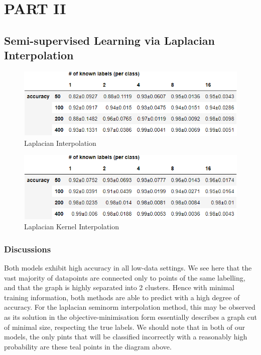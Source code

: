 \documentclass[12pt]{article}
\begin{document}
\newpage
\section{PART II}
\subsection{Semi-supervised Learning via Laplacian Interpolation}


    \begin{figure}[h]
    \centering
    \includegraphics[scale=0.5]{outputs/part2/laplacian_interpolation_report.png}
    \caption{Laplacian Interpolation}
    \label{fig:12}
    \end{figure}

    \begin{figure}[h]
    \centering
    \includegraphics[scale=0.5]{outputs/part2/laplacian_kernel_interpolation_report.png}
    \caption{Laplacian Kernel Interpolation}
    \label{fig:13}
    \end{figure}

\subsubsection{Discussions}
Both models exhibit high accuracy in all low-data settings. We see here that the vast majority of datapoints are connected only to points
of the same labelling, and that the graph is highly separated into 2 clusters.
Hence with minimal training information, both methods are able to predict with a
high degree of accuracy. For the laplacian seminorm interpolation method, this may be observed 
as its solution in the objective-minimisation form essentially describes a graph cut of minimal size, respecting
the true labels. We should note that in both of our models, the only pints that will be classified incorrectly with a 
reasonably high probability are these teal points in the diagram above.\\
\end{document}
